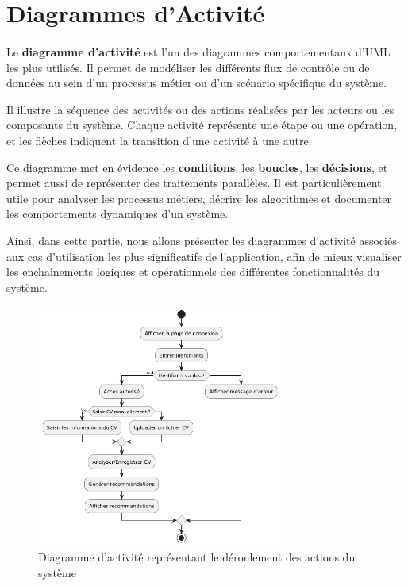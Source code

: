 \section{Diagrammes d’Activité}
\paragraph{}\begin{spacing}{1}
Le \textbf{diagramme d’activité} est l’un des diagrammes comportementaux d’UML les plus utilisés. Il permet de modéliser les différents flux de contrôle ou de données au sein d’un processus métier ou d’un scénario spécifique du système.

Il illustre la séquence des activités ou des actions réalisées par les acteurs ou les composants du système. Chaque activité représente une étape ou une opération, et les flèches indiquent la transition d’une activité à une autre.

Ce diagramme met en évidence les \textbf{conditions}, les \textbf{boucles}, les \textbf{décisions}, et permet aussi de représenter des traitements parallèles. Il est particulièrement utile pour analyser les processus métiers, décrire les algorithmes et documenter les comportements dynamiques d’un système.

Ainsi, dans cette partie, nous allons présenter les diagrammes d’activité associés aux cas d’utilisation les plus significatifs de l’application, afin de mieux visualiser les enchaînements logiques et opérationnels des différentes fonctionnalités du système.
\end{spacing}
\begin{figure}
    \includegraphics[width=\linewidth, height=8cm]{images/diagramme activite.png}
    \caption{Diagramme d'activité représentant le déroulement des actions du système}
    
\end{figure}

